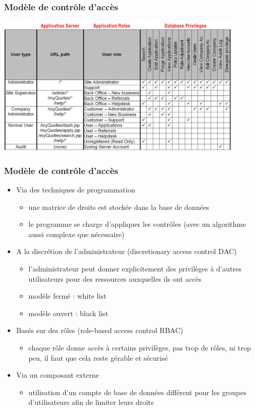 \documentclass[aspectratio=169]{beamer}  %
\begin{document}
\begin{frame}
  \frametitle{Modèle de contrôle d'accès}
  \begin{center}
    \includegraphics[height=18em]{matrice-droit}
  \end{center}
\end{frame}

\begin{frame}
  \frametitle{Modèle de contrôle d'accès}
  \begin{itemize}
    \item Via des techniques de programmation
    \begin{itemize}
      \item une matrice de droits est stockée dans la base de données 
      \item le programme se charge d'appliquer les contrôles (avec un algorithme aussi complexe que nécessaire)
    \end{itemize}
    \pause
    \item A la discrétion de l'administrateur (discretionary access control DAC)
    \begin{itemize}
      \item l'administrateur peut donner explicitement des privilèges à d'autres utilisateurs pour des ressources auxquelles ils ont accès
      \item modèle fermé : white list
      \item modèle ouvert : black list
    \end{itemize}
    \pause
    \item Basés sur des rôles (role-based access control RBAC)
    \begin{itemize}
      \item chaque rôle donne accès à certains privilèges, pas trop de rôles, ni trop peu, il faut que cela reste gérable et sécurisé
    \end{itemize}
    \pause
    \item Via un composant externe
    \begin{itemize}
      \item utilisation d'un compte de base de données différent pour les groupes d'utilisateurs afin de limiter leurs droits
    \end{itemize}
  \end{itemize}
\end{frame}
\end{document}
